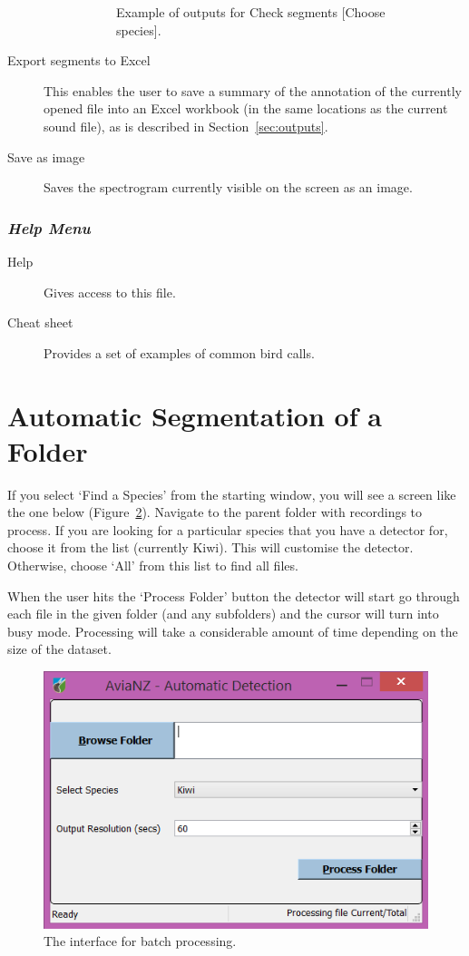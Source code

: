 \documentclass{article}
\begin{document}
\begin{description}
\begin{description}
\begin{figure}
	\caption{Example of outputs for Check segments [Choose species].}
	\label{check2}
	\end{figure}
	\end{description}

\item [Export segments to Excel] This enables the user to save a summary of the annotation of the currently opened file into an Excel workbook (in the same locations as the current sound file), as is described in Section~\ref{sec:outputs}. 
\item [Save as image] Saves the spectrogram currently visible on the screen as an image.
\end{description}

\subsubsection{{\em Help Menu}}

\begin{description}
\item [Help] Gives access to this file.
\item [Cheat sheet] Provides a set of examples of common bird calls. 
\end{description}


\section{Automatic Segmentation of a Folder}
\label{sec:auto}
If you select `Find a Species' from the starting window, you will see a screen like the one below (Figure~\ref{batch}). Navigate to the parent folder with recordings to process. If you are looking for a particular species that you have a detector for, choose it from the list (currently Kiwi). This will customise the detector. Otherwise, choose `All' from this list to find all files. 

When the user hits the `Process Folder' button the detector will start go through each file in the given folder (and any subfolders) and the cursor will turn into busy mode. Processing will take a considerable amount of time depending on the size of the dataset.

\begin{figure}[h!]
\centering
\includegraphics[width=.5\textwidth]{Figs/proc_folder}
\caption{The interface for batch processing.}
\label{batch}
\end{figure}
\end{document}
